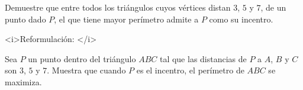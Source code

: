 Demuestre que entre todos los triángulos cuyos vértices distan $3$, $5$ y $7$, de un punto dado $P$, el que tiene mayor perímetro admite a $P$ como su incentro. \newline  \newline 

<i>Reformulación: </i>

Sea $P$ un punto dentro del triángulo $ABC$ tal que las distancias de $P$ a $A$, $B$ y $C$ son $3$, $5$ y $7$. Muestra que cuando $P$ es el incentro, el perímetro de $ABC$ se maximiza.